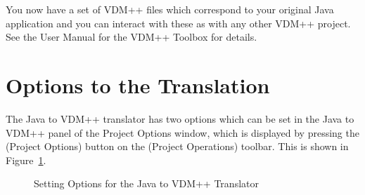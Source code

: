 \documentclass[\pformat,12pt]{article}
\newcommand{\guicmd}[1]{{\sf #1}}
\begin{document}
You now have a set of VDM++ files which correspond to your original
Java application and you can interact with these as with any other
VDM++ project. See the User Manual for the VDM++ Toolbox
\cite{UserManPP-SCSK} for details.


\section{Options to the Translation}

The Java to VDM++ translator has two options which can be set in the 
\guicmd{Java to VDM++} panel of the \guicmd{Project Options} window, 
which is displayed by pressing the
(\guicmd{Project Options}) button on the (\guicmd{Project Operations})
toolbar. This is shown in Figure~\ref{fig:j2voptions}.

\begin{figure}[tbh]
\begin{center}
\caption{Setting Options for the Java to VDM++ Translator\label{fig:j2voptions}}
\end{center}
\end{figure}
\end{document}

